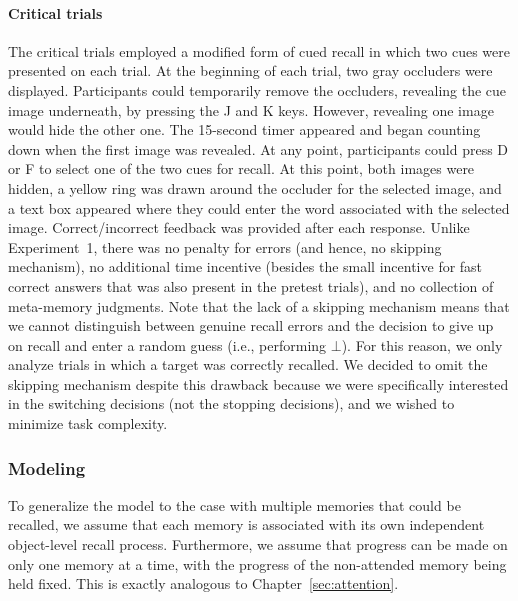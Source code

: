 \paragraph{Critical trials} The critical trials employed a modified form of cued recall in which two cues were presented on each trial. At the beginning of each trial, two gray occluders were displayed. Participants could temporarily remove the occluders, revealing the cue image underneath, by pressing the J and K keys. However, revealing one image would hide the other one. The 15-second timer appeared and began counting down when the first image was revealed. At any point, participants could press D or F to select one of the two cues for recall. At this point, both images were hidden, a yellow ring was drawn around the occluder for the selected image, and a text box appeared where they could enter the word associated with the selected image. Correct/incorrect feedback was provided after each response. Unlike Experiment~1, there was no penalty for errors (and hence, no skipping mechanism), no additional time incentive (besides the small incentive for fast correct answers that was also present in the pretest trials), and no collection of meta-memory judgments. Note that the lack of a skipping mechanism means that we cannot distinguish between genuine recall errors and the decision to give up on recall and enter a random guess (i.e., performing $\bot$). For this reason, we only analyze trials in which a target was correctly recalled. We decided to omit the skipping mechanism despite this drawback because we were specifically interested in the switching decisions (not the stopping decisions), and we wished to minimize task complexity.


\subsubsection{Modeling}


To generalize the model to the case with multiple memories that could be recalled, we assume that each memory is associated with its own independent object-level recall process. Furthermore, we assume that progress can be made on only one memory at a time, with the progress of the non-attended memory being held fixed. This is exactly analogous to Chapter~\ref{sec:attention}.

